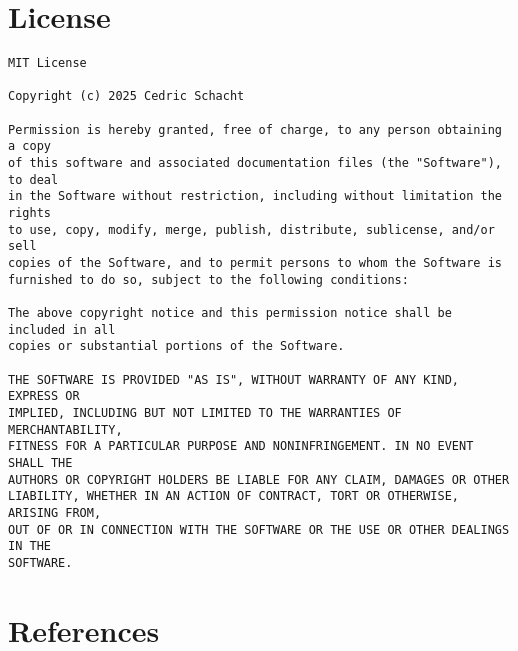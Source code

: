 \documentclass{article}
\begin{document}
\section*{License}
\begin{verbatim}
MIT License

Copyright (c) 2025 Cedric Schacht

Permission is hereby granted, free of charge, to any person obtaining a copy
of this software and associated documentation files (the "Software"), to deal
in the Software without restriction, including without limitation the rights
to use, copy, modify, merge, publish, distribute, sublicense, and/or sell
copies of the Software, and to permit persons to whom the Software is
furnished to do so, subject to the following conditions:

The above copyright notice and this permission notice shall be included in all
copies or substantial portions of the Software.

THE SOFTWARE IS PROVIDED "AS IS", WITHOUT WARRANTY OF ANY KIND, EXPRESS OR
IMPLIED, INCLUDING BUT NOT LIMITED TO THE WARRANTIES OF MERCHANTABILITY,
FITNESS FOR A PARTICULAR PURPOSE AND NONINFRINGEMENT. IN NO EVENT SHALL THE
AUTHORS OR COPYRIGHT HOLDERS BE LIABLE FOR ANY CLAIM, DAMAGES OR OTHER
LIABILITY, WHETHER IN AN ACTION OF CONTRACT, TORT OR OTHERWISE, ARISING FROM,
OUT OF OR IN CONNECTION WITH THE SOFTWARE OR THE USE OR OTHER DEALINGS IN THE
SOFTWARE.
\end{verbatim}

\section*{References}

\end{document}

